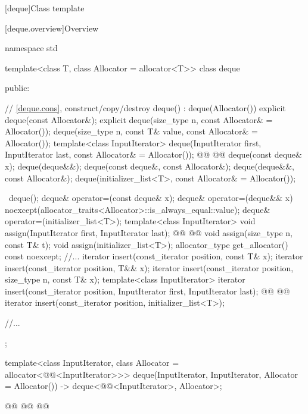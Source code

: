 \documentclass{wg21}
\begin{document}
[deque]{Class template }

[deque.overview]{Overview}
\begin{codeblock}
namespace std {
    template<class T, class Allocator = allocator<T>>
    class deque {
        public:
        
        // \ref{deque.cons}, construct/copy/destroy
        deque() : deque(Allocator()) { }
        explicit deque(const Allocator&);
        explicit deque(size_type n, const Allocator& = Allocator());
        deque(size_type n, const T& value, const Allocator& = Allocator());
        template<class InputIterator>
        deque(InputIterator first, InputIterator last, const Allocator& = Allocator());
        @@
        @@
        deque(const deque& x);
        deque(deque&&);
        deque(const deque&, const Allocator&);
        deque(deque&&, const Allocator&);
        deque(initializer_list<T>, const Allocator& = Allocator());
        
        ~deque();
        deque& operator=(const deque& x);
        deque& operator=(deque&& x)
        noexcept(allocator_traits<Allocator>::is_always_equal::value);
        deque& operator=(initializer_list<T>);
        template<class InputIterator>
        void assign(InputIterator first, InputIterator last);
        @@
        @@
        void assign(size_type n, const T& t);
        void assign(initializer_list<T>);
        allocator_type get_allocator() const noexcept;
        //...
        iterator insert(const_iterator position, const T& x);
        iterator insert(const_iterator position, T&& x);
        iterator insert(const_iterator position, size_type n, const T& x);
        template<class InputIterator>
        iterator insert(const_iterator position, InputIterator first, InputIterator last);
        @@
        @@
        iterator insert(const_iterator position, initializer_list<T>);
        
        //...
    };
    
    template<class InputIterator, class Allocator = allocator<@@<InputIterator>>>
    deque(InputIterator, InputIterator, Allocator = Allocator())
    -> deque<@@<InputIterator>, Allocator>;
    
    @@
    @@
    @@
}
\end{codeblock}
\end{document}
